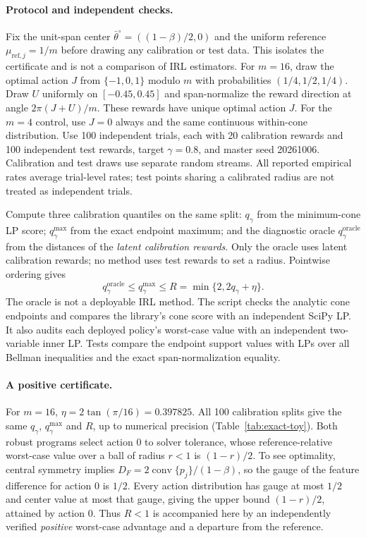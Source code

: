 \paragraph{Protocol and independent checks.}
Fix the unit-span center $\bar\theta^\circ=((1-\beta)/2,0)$ and the uniform
reference $\mu_{\mathrm{ref},j}=1/m$ before drawing any calibration or test
data. This isolates the certificate and is not a comparison of IRL estimators.
For $m=16$, draw the optimal action $J$ from $\{-1,0,1\}$ modulo $m$ with
probabilities $(1/4,1/2,1/4)$. Draw $U$ uniformly on $[-0.45,0.45]$ and
span-normalize the reward direction at angle $2\pi(J+U)/m$. These rewards
have unique optimal action $J$. For the $m=4$ control, use $J=0$ always and
the same continuous within-cone distribution. Use 100 independent trials,
each with 20 calibration rewards and 100 independent test rewards, target
$\gamma=0.8$, and master seed 20261006. Calibration and test draws use separate
random streams. All reported empirical rates average trial-level rates;
test points sharing a calibrated radius are not treated as independent trials.

Compute three calibration quantiles on the same split: $q_\gamma$ from the
minimum-cone LP score; $q_\gamma^{\max}$ from the exact endpoint maximum;
and the diagnostic oracle $q_\gamma^{\mathrm{oracle}}$ from the distances of
the \emph{latent calibration rewards}. Only the oracle uses latent calibration
rewards; no method uses test rewards to set a radius. Pointwise ordering gives
\[
 q_\gamma^{\mathrm{oracle}}\le q_\gamma^{\max}
 \le R=\min\{2,2q_\gamma+\eta\}.
\]
The oracle is not a deployable IRL method. The script checks the analytic cone
endpoints and compares the library's cone score with an independent SciPy LP.
It also audits each deployed policy's worst-case value with an independent
two-variable inner LP. Tests compare the endpoint support values with LPs over
all Bellman inequalities and the exact span-normalization equality.

\paragraph{A positive certificate.}
For $m=16$, $\eta=2\tan(\pi/16)=0.397825$. All 100 calibration splits give
the same $q_\gamma$, $q_\gamma^{\max}$ and $R$, up to numerical precision
(Table~\ref{tab:exact-toy}). Both robust programs select action 0 to solver
tolerance, whose reference-relative worst-case value over a ball of radius
$r<1$ is $(1-r)/2$. To see optimality, central symmetry implies
$D_F=2\operatorname{conv}\{p_j\}/(1-\beta)$, so the gauge of the feature
difference for action 0 is $1/2$. Every action distribution has gauge at most
$1/2$ and center value at most that gauge, giving the upper bound $(1-r)/2$,
attained by action 0. Thus $R<1$ is accompanied here by an independently
verified \emph{positive} worst-case advantage and a departure from the reference.

